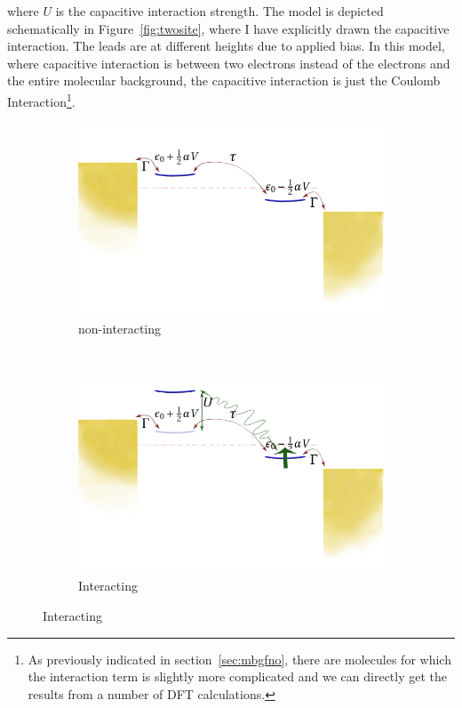 where $U$ is the capacitive interaction strength.  The model is depicted schematically in Figure~\ref{fig:twosite}, where I have explicitly drawn the capacitive interaction. The leads are at different heights due to applied bias. In this model, where capacitive interaction is between two electrons instead of the electrons and the entire molecular background, the capacitive interaction is just the Coulomb Interaction\footnote{As previously indicated in section~\ref{sec:mbgfno}, there are molecules for which the interaction term is slightly more complicated and we can directly get the results from a number of DFT calculations.}.


\begin{figure}[!bt]
    \begin{subfigure}[b]{0.48\textwidth}
        \includegraphics[height=.20\textheight]{pdf/non_interacting_schematics.pdf}\caption{non\hyp{}interacting}\label{fig:twositea}
    \end{subfigure}
    ~
    \begin{subfigure}[b]{0.48\textwidth}
        \includegraphics[height=.20\textheight]{pdf/interacting_schematics.pdf}\caption{Interacting}\label{fig:twositeb}

\end{subfigure}
\end{figure}
